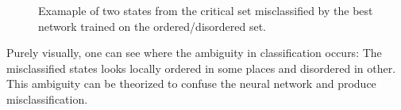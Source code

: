 \begin{figure}[H]
\centering
{}
\qquad
{}
\caption{Examaple of two states from the critical set misclassified by the best network trained on the ordered/disordered set.}
\label{fig:NN_misclass}
\end{figure}

Purely visually, one can see where the ambiguity in classification occurs: The misclassified states looks locally ordered in some places and disordered in other. This ambiguity can be theorized to confuse the neural network and produce misclassification.  

